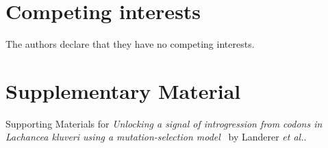 \documentclass[doublespacing,linenumbers]{bmcart}
\newcommand\suppl{\par
  \setcounter{section}{0}%
  \setcounter{subsection}{0}%
  \setcounter{table}{0}%
  \setcounter{figure}{0}%
  \setcounter{equation}{0}%
  \gdef\thesection{\Alph{section}.1}%
  \def\thefigure{\Alph{section}\arabic{figure}}%
  \def\thetable{\Alph{section}\arabic{table}}%
  \def\theequation {\Alph{section}\arabic{equation}}}
\begin{document}
\begin{backmatter}
\section*{Competing interests}
The authors declare that they have no competing interests.



 
%



\clearpage



\suppl

\setcounter{section}{19} %
\setcounter{page}{1}
\renewcommand{\thepage}{S\arabic{page}} %

\section*{Supplementary Material}

Supporting Materials for \emph{Unlocking a signal of introgression from codons in Lachancea kluveri using a mutation-selection model} \ by Landerer \emph{et al.}.


\end{backmatter}
\end{document}
